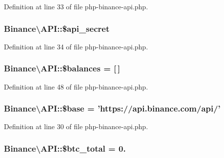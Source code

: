 Definition at line 33 of file php-\/binance-\/api.\-php.

\hypertarget{classBinance_1_1API_a5612f3068ec5843031812893537e7677}{
\subsubsection[{\$api\-\_\-secret}]{\setlength{\rightskip}{0pt plus 5cm}Binance\textbackslash{}\-A\-P\-I\-::\$api\-\_\-secret\hspace{0.3cm}{\ttfamily [protected]}}}\label{classBinance_1_1API_a5612f3068ec5843031812893537e7677}


Definition at line 34 of file php-\/binance-\/api.\-php.

\hypertarget{classBinance_1_1API_a706b2458b10d731ea4918714c333a845}{
\subsubsection[{\$balances}]{\setlength{\rightskip}{0pt plus 5cm}Binance\textbackslash{}\-A\-P\-I\-::\$balances = \mbox{[}$\,$\mbox{]}}}\label{classBinance_1_1API_a706b2458b10d731ea4918714c333a845}


Definition at line 48 of file php-\/binance-\/api.\-php.

\hypertarget{classBinance_1_1API_ac863e52396757997d84e6783b5336828}{
\subsubsection[{\$base}]{\setlength{\rightskip}{0pt plus 5cm}Binance\textbackslash{}\-A\-P\-I\-::\$base = 'https\-://api.\-binance.\-com/api/'\hspace{0.3cm}{\ttfamily [protected]}}}\label{classBinance_1_1API_ac863e52396757997d84e6783b5336828}


Definition at line 30 of file php-\/binance-\/api.\-php.

\hypertarget{classBinance_1_1API_a80f67dda302da9465596ad5e0bd86ce2}{
\subsubsection[{\$btc\-\_\-total}]{\setlength{\rightskip}{0pt plus 5cm}Binance\textbackslash{}\-A\-P\-I\-::\$btc\-\_\-total = 0.}}\label{classBinance_1_1API_a80f67dda302da9465596ad5e0bd86ce2}


